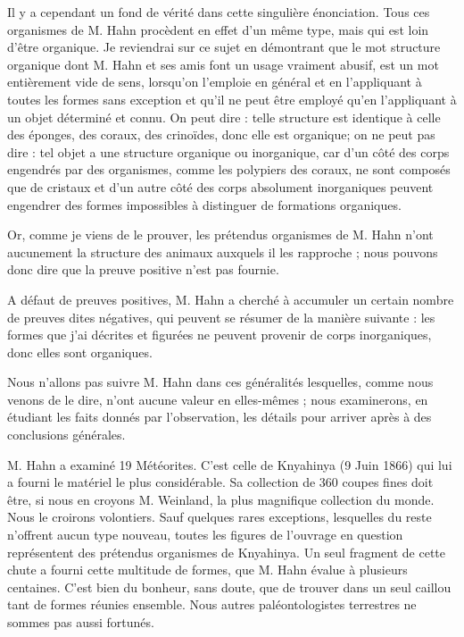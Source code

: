 \documentclass[a4paper, 12pt, oneside, french]{article}
\begin{document}
Il y a cependant un fond de vérité dans cette singulière énonciation. Tous ces organismes de M. Hahn procèdent en effet d'un même type, mais qui est loin d'être organique. Je reviendrai sur ce sujet en démontrant que le mot \og structure organique \fg dont M. Hahn et ses amis font un usage vraiment abusif, est un mot entièrement vide de sens, lorsqu'on l'emploie en général et en l'appliquant à toutes les formes sans exception et qu'il ne peut être employé qu'en l'appliquant à un objet déterminé et connu. On peut dire : telle structure est identique à celle des éponges, des coraux, des crinoïdes, donc elle est organique; on ne peut pas dire : tel objet a une structure organique ou inorganique, car d'un côté des corps engendrés par des organismes, comme les polypiers des coraux, ne sont composés que de cristaux et d'un autre côté des corps absolument inorganiques peuvent engendrer des formes impossibles à distinguer de formations organiques.

Or, comme je viens de le prouver, les prétendus organismes de M. Hahn n'ont aucunement la structure des animaux auxquels il les rapproche ; nous pouvons donc dire que la preuve positive n'est pas fournie.

A défaut de preuves positives, M. Hahn a cherché à accumuler un certain nombre de preuves dites négatives, qui peuvent se résumer de la manière suivante : les formes que j'ai décrites et figurées ne peuvent provenir de corps inorganiques, donc elles sont organiques.

Nous n'allons pas suivre M. Hahn dans ces généralités lesquelles, comme nous venons de le dire, n'ont aucune valeur en elles-mêmes ; nous examinerons, en étudiant les faits donnés par l'observation, les détails pour arriver après à des conclusions générales.

M. Hahn a examiné 19 Météorites. C'est celle de Knyahinya (9 Juin 1866) qui lui a fourni le matériel le plus considérable. Sa collection de 360 coupes fines doit être, si nous en croyons M. Weinland, la plus magnifique collection du monde. Nous le croirons volontiers. Sauf quelques rares exceptions, lesquelles du reste n'offrent aucun type nouveau, toutes les figures de l'ouvrage en question représentent des prétendus organismes de Knyahinya. Un seul fragment de cette chute a fourni cette multitude de formes, que M. Hahn évalue à plusieurs centaines. C'est bien du bonheur, sans doute, que de trouver dans un seul caillou tant de formes réunies ensemble. Nous autres paléontologistes terrestres ne sommes pas aussi fortunés.
\end{document}
